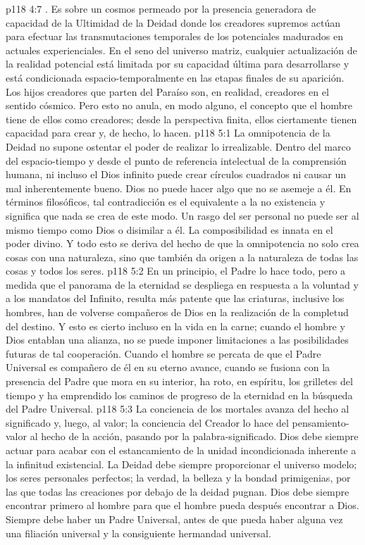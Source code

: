 \vs p118 4:7 . Es sobre un cosmos permeado por la presencia generadora de capacidad de la Ultimidad de la Deidad donde los creadores supremos actúan para efectuar las transmutaciones temporales de los potenciales madurados en actuales experienciales. En el seno del universo matriz, cualquier actualización de la realidad potencial está limitada por su capacidad última para desarrollarse y está condicionada espacio\hyp{}temporalmente en las etapas finales de su aparición. Los hijos creadores que parten del Paraíso son, en realidad, creadores  en el sentido cósmico. Pero esto no anula, en modo alguno, el concepto que el hombre tiene de ellos como creadores; desde la perspectiva finita, ellos ciertamente tienen capacidad para crear y, de hecho, lo hacen.
\vs p118 5:1 La omnipotencia de la Deidad no supone ostentar el poder de realizar lo irrealizable. Dentro del marco del espacio\hyp{}tiempo y desde el punto de referencia intelectual de la comprensión humana, ni incluso el Dios infinito puede crear círculos cuadrados ni causar un mal inherentemente bueno. Dios no puede hacer algo que no se asemeje a él. En términos filosóficos, tal contradicción es el equivalente a la no existencia y significa que nada se crea de este modo. Un rasgo del ser personal no puede ser al mismo tiempo como Dios o disimilar a él. La composibilidad es innata en el poder divino. Y todo esto se deriva del hecho de que la omnipotencia no solo crea cosas con una naturaleza, sino que también da origen a la naturaleza de todas las cosas y todos los seres.
\vs p118 5:2 \pc En un principio, el Padre lo hace todo, pero a medida que el panorama de la eternidad se despliega en respuesta a la voluntad y a los mandatos del Infinito, resulta más patente que las criaturas, inclusive los hombres, han de volverse compañeros de Dios en la realización de la completud del destino. Y esto es cierto incluso en la vida en la carne; cuando el hombre y Dios entablan una alianza, no se puede imponer limitaciones a las posibilidades futuras de tal cooperación. Cuando el hombre se percata de que el Padre Universal es compañero de él en su eterno avance, cuando se fusiona con la presencia del Padre que mora en su interior, ha roto, en espíritu, los grilletes del tiempo y ha emprendido los caminos de progreso de la eternidad en la búsqueda del Padre Universal.
\vs p118 5:3 La conciencia de los mortales avanza del hecho al significado y, luego, al valor; la conciencia del Creador lo hace del pensamiento\hyp{}valor al hecho de la acción, pasando por la palabra\hyp{}significado. Dios debe siempre actuar para acabar con el estancamiento de la unidad incondicionada inherente a la infinitud existencial. La Deidad debe siempre proporcionar el universo modelo; los seres personales perfectos; la verdad, la belleza y la bondad primigenias, por las que todas las creaciones por debajo de la deidad pugnan. Dios debe siempre encontrar primero al hombre para que el hombre pueda después encontrar a Dios. Siempre debe haber un Padre Universal, antes de que pueda haber alguna vez una filiación universal y la consiguiente hermandad universal.
